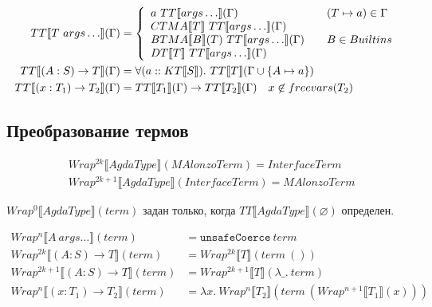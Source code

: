 \begin{align*}
TT\llbracket T\ args\ldots \rrbracket(\Gamma) &= \left\{
   \begin{array}{l l}
      a\ TT\llbracket args\ldots \rrbracket(\Gamma) &\quad (T \mapsto a) \in \Gamma \\
      CTMA\llbracket T \rrbracket\ TT\llbracket args\ldots \rrbracket(\Gamma)\\
      BTMA\llbracket B \rrbracket(T)\ TT\llbracket args\ldots \rrbracket(\Gamma)
         &\quad B \in Builtins\\
      DT\llbracket T \rrbracket\ TT\llbracket args\ldots \rrbracket(\Gamma)\\
   \end{array}\right.\\
TT\llbracket (A : S) \rightarrow T \rrbracket(\Gamma) &=
   \forall (a :: KT\llbracket S \rrbracket).\ TT\llbracket T \rrbracket
   (\Gamma \cup \{A \mapsto a\})\\
TT\llbracket (x : T_1) \rightarrow T_2 \rrbracket(\Gamma) &=
   TT\llbracket T_1 \rrbracket(\Gamma) \rightarrow TT\llbracket T_2 \rrbracket(\Gamma)
   \quad x \not\in freevars(T_2)
\end{align*}

\subsection{Преобразование термов}

\begin{align*}
&Wrap^{2k}\llbracket AgdaType \rrbracket(MAlonzoTerm) = InterfaceTerm\\
&Wrap^{2k+1}\llbracket AgdaType \rrbracket(InterfaceTerm) = MAlonzoTerm
\end{align*}

\(Wrap^0\llbracket AgdaType \rrbracket(term)\) задан только, когда
\(TT\llbracket AgdaType \rrbracket(\varnothing)\) определен.

\begin{align*}
Wrap^n\llbracket A\ args\ldots \rrbracket(term) &= \texttt{unsafeCoerce}\ term\\
Wrap^{2k}\llbracket (A : S) \rightarrow T \rrbracket(term) &=
   Wrap^{2k}\llbracket T \rrbracket(term\ ())\\
Wrap^{2k+1}\llbracket (A : S) \rightarrow T \rrbracket(term) &=
   Wrap^{2k+1}\llbracket T \rrbracket(\lambda \_.\ term)\\
Wrap^n\llbracket (x : T_1) \rightarrow T_2 \rrbracket(term) &=
   \lambda x.\ Wrap^n\llbracket T_2 \rrbracket(term\ (
   Wrap^{n+1}\llbracket T_1 \rrbracket(x)))
\end{align*}

